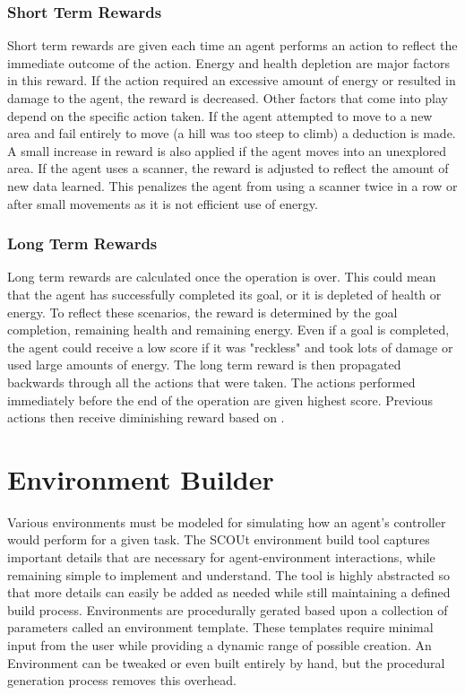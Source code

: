 \subsubsection{Short Term Rewards}
Short term rewards are given each time an agent performs an action to reflect the immediate outcome of the action.
Energy and health depletion are major factors in this reward.
If the action required an excessive amount of energy or resulted in damage to the agent, the reward is decreased.
Other factors that come into play depend on the specific action taken.
If the agent attempted to move to a new area and fail entirely to move (a hill was too steep to climb) a deduction is made.
A small increase in reward is also applied if the agent moves into an unexplored area.
If the agent uses a scanner, the reward is adjusted to reflect the amount of new data learned.
This penalizes the agent from using a scanner twice in a row or after small movements as it is not efficient use of energy.

\subsubsection{Long Term Rewards}
Long term rewards are calculated once the operation is over.
This could mean that the agent has successfully completed its goal, or it is depleted of health or energy.
To reflect these scenarios, the reward is determined by the goal completion, remaining health and remaining energy. 
Even if a goal is completed, the agent could receive a low score if it was "reckless" and took lots of damage or used large amounts of energy.
The long term reward is then propagated backwards through all the actions that were taken.
The actions performed immediately before the end of the operation are given highest score.
Previous actions then receive diminishing reward based on .



\section{Environment Builder}
Various environments must be modeled for simulating how an agent's controller would perform for a given task.
The SCOUt environment build tool captures important details that are necessary for agent-environment interactions, while remaining simple to implement and understand.
The tool is highly abstracted so that more details can easily be added as needed while still maintaining a defined build process.
Environments are procedurally gerated based upon a collection of parameters called an environment template.
These templates require minimal input from the user while providing a dynamic range of possible creation.
An Environment can be tweaked or even built entirely by hand, but the procedural generation process removes this overhead.


